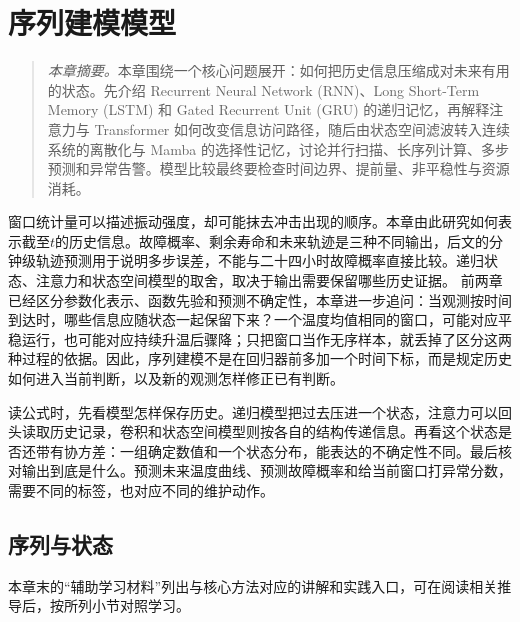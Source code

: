 ﻿\chapter{序列建模模型}
\begin{quote}\small
\textit{本章摘要。}本章围绕一个核心问题展开：如何把历史信息压缩成对未来有用的状态。先介绍 Recurrent Neural Network (RNN)、Long Short-Term Memory (LSTM) 和 Gated Recurrent Unit (GRU) 的递归记忆，再解释注意力与 Transformer 如何改变信息访问路径，随后由状态空间滤波转入连续系统的离散化与 Mamba 的选择性记忆，讨论并行扫描、长序列计算、多步预测和异常告警。模型比较最终要检查时间边界、提前量、非平稳性与资源消耗。
\end{quote}
窗口统计量可以描述振动强度，却可能抹去冲击出现的顺序。本章由此研究如何表示截至$t$的历史信息。故障概率、剩余寿命和未来轨迹是三种不同输出，后文的分钟级轨迹预测用于说明多步误差，不能与二十四小时故障概率直接比较。递归状态、注意力和状态空间模型的取舍，取决于输出需要保留哪些历史证据。
前两章已经区分参数化表示、函数先验和预测不确定性，本章进一步追问：当观测按时间到达时，哪些信息应随状态一起保留下来？一个温度均值相同的窗口，可能对应平稳运行，也可能对应持续升温后骤降；只把窗口当作无序样本，就丢掉了区分这两种过程的依据。因此，序列建模不是在回归器前多加一个时间下标，而是规定历史如何进入当前判断，以及新的观测怎样修正已有判断。

读公式时，先看模型怎样保存历史。递归模型把过去压进一个状态，注意力可以回头读取历史记录，卷积和状态空间模型则按各自的结构传递信息。再看这个状态是否还带有协方差：一组确定数值和一个状态分布，能表达的不确定性不同。最后核对输出到底是什么。预测未来温度曲线、预测故障概率和给当前窗口打异常分数，需要不同的标签，也对应不同的维护动作。
\section{序列与状态}

本章末的“辅助学习材料”列出与核心方法对应的讲解和实践入口，可在阅读相关推导后，按所列小节对照学习。

